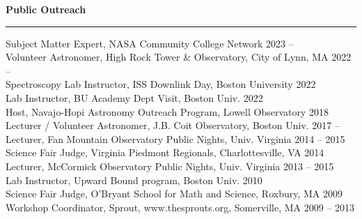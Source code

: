 \documentclass[12pt]{report}
\begin{document}
\noindent\bf{Public Outreach}\rm \hspace*{\fill} \\
\rule{\textwidth}{1pt}
\noindent Subject Matter Expert, NASA Community College Network \hfill 2023 –     \\
\noindent Volunteer Astronomer, High Rock Tower \& Observatory, City of Lynn, MA \hfill 2022 –     \\
\noindent Spectroscopy Lab Instructor, ISS Downlink Day, Boston University \hfill 2022\\
\noindent Lab Instructor, BU Academy Dept Visit, Boston Univ. \hfill 2022\\
\noindent Host, Navajo-Hopi Astronomy Outreach Program, Lowell Observatory \hfill 2018\\
\noindent Lecturer / Volunteer Astronomer, J.B. Coit Observatory, Boston Univ.	 \hfill 2017 –     \\
\noindent Lecturer, Fan Mountain Observatory Public Nights, Univ. Virginia \hfill 2014 – 2015\\
\noindent Science Fair Judge, Virginia Piedmont Regionals, Charlottesville, VA \hfill 2014\\
\noindent Lecturer, McCormick Observatory Public Nights, Univ. Virginia			\hfill 2013 – 2015\\
\noindent Lab Instructor, Upward Bound program, Boston Univ. \hfill 2010\\
\noindent Science Fair Judge, O'Bryant School for Math and Science, Roxbury, MA \hfill 2009\\
\noindent Workshop Coordinator, Sprout, www.thesprouts.org, Somerville, MA \hfill 2009 – 2013\\
\end{document}

